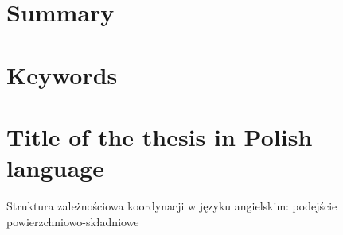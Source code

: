 \documentclass[12pt]{report}
\begin{document}


\onehalfspacing

\pagestyle{empty}
\section*{\centering Summary}

\section*{\centering Keywords}

\section*{\centering Title of the thesis in Polish language}
Struktura zależnościowa koordynacji w języku angielskim: podejście powierzchniowo-składniowe

%
%

\newlength{\treeheight}
\newlength{\treewidth}

\tableofcontents
\end{document}
